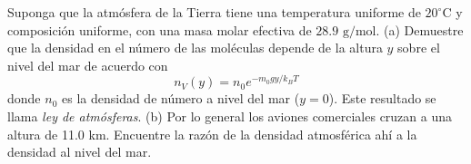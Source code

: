 \item Suponga que la atmósfera de la Tierra tiene una temperatura uniforme de $20^\circ\text{C}$ y composición uniforme, con una masa molar efectiva de $28.9\text{ g/mol}$. (a) Demuestre que la densidad en el número de las moléculas depende de la altura $y$ sobre el nivel del mar de acuerdo con
$$ n_V(y) = n_0 e^{-m_0gy/k_BT} $$
donde $n_0$ es la densidad de número a nivel del mar ($y = 0$). Este resultado se llama \textit{ley de atmósferas}. (b) Por lo general los aviones comerciales cruzan a una altura de 11.0 km. Encuentre la razón de la densidad atmosférica ahí a la densidad al nivel del mar.
